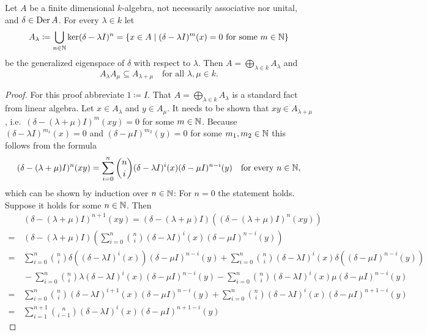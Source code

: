 \begin{lemma}\label{lem: generalized eigenspace decomposition for derivations}
 Let $A$ be a finite dimensional $k$-algebra, not necessarily associative nor unital, and $\delta \in \operatorname{Der} A$. For every $\lambda \in k$ let
 \[
  A_\lambda
  \coloneqq \bigcup_{n \in \mathbb{N}} \ker(\delta-\lambda I)^n
  = \{x \in A \mid \text{$(\delta-\lambda I)^m(x) = 0$ for some $m \in \mathbb{N}$}\}
 \]
 be the generalized eigenspace of $\delta$ with respect to $\lambda$. Then $A = \bigoplus_{\lambda \in k} A_\lambda$ and
 \[
  A_\lambda A_\mu \subseteq A_{\lambda + \mu} \quad \text{for all $\lambda, \mu \in k$}.
 \]
\end{lemma}
\begin{proof}
 For this proof abbreviate $1 \coloneqq I$. That $A = \bigoplus_{\lambda \in k} A_\lambda$ is a standard fact from linear algebra. Let $x \in A_\lambda$ and $y \in A_\mu$. It needs to be shown that $xy \in A_{\lambda + \mu}$, i.e.\ $(\delta-(\lambda+\mu)I)^m(xy) = 0$ for some $m \in \mathbb{N}$. Because $(\delta-\lambda I)^{m_1}(x) = 0$ and $(\delta-\mu I)^{m_2}(y) = 0$ for some $m_1, m_2 \in \mathbb{N}$ this follows from the formula
 \[
  (\delta-(\lambda+\mu)I)^n(xy)
  = \sum_{i=0}^n \binom{n}{i} (\delta-\lambda I)^i(x) (\delta-\mu I)^{n-i}(y)
  \quad\text{for every $n \in \mathbb{N}$},
 \]
 which can be shown by induction over $n \in \mathbb{N}$: For $n = 0$ the statement holds. Suppose it holds for some $n \in \mathbb{N}$. Then
 \begingroup
 \allowdisplaybreaks
 \begin{align*}
  &\, (\delta-(\lambda+\mu)I)^{n+1}(xy)
  = (\delta-(\lambda+\mu)I)((\delta-(\lambda+\mu)I)^n(xy)) \\
  =&\, (\delta-(\lambda+\mu)I)\left(
       \sum_{i=0}^n \binom{n}{i} (\delta-\lambda I)^i(x) (\delta-\mu I)^{n-i}(y)
       \right) \\
  =&\,  \sum_{i=0}^n \binom{n}{i} \delta\left( (\delta-\lambda I)^i(x) \right) (\delta-\mu I)^{n-i}(y)
       +\sum_{i=0}^n \binom{n}{i} (\delta-\lambda I)^i(x) \delta\left( (\delta-\mu I)^{n-i}(y) \right) \\
   &\, -\sum_{i=0}^n \binom{n}{i} \lambda(\delta-\lambda I)^i(x) (\delta-\mu I)^{n-i}(y)
       -\sum_{i=0}^n \binom{n}{i} (\delta-\lambda I)^i(x) \mu(\delta-\mu I)^{n-i}(y) \\
  =&\,  \sum_{i=0}^n \binom{n}{i} (\delta-\lambda I)^{i+1}(x) (\delta-\mu I)^{n-i}(y)
       +\sum_{i=0}^n \binom{n}{i} (\delta-\lambda I)^i(x) (\delta-\mu I)^{n+1-i}(y) \\
  =&\,  \sum_{i=1}^{n+1} \binom{n}{i-1} (\delta-\lambda I)^i(x) (\delta-\mu I)^{n+1-i}(y)

\end{align*}
\end{proof}

